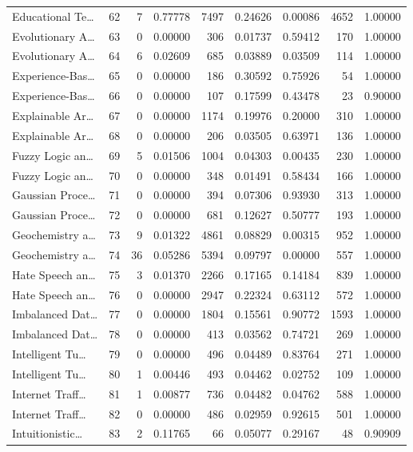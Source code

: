 \begin{table}
\begin{tabular}{lrrrrrrrr}
Educational Te… & 62 & 7 & 0.77778 & 7497 & 0.24626 & 0.00086 & 4652 & 1.00000 \\
Evolutionary A… & 63 & 0 & 0.00000 & 306 & 0.01737 & 0.59412 & 170 & 1.00000 \\
Evolutionary A… & 64 & 6 & 0.02609 & 685 & 0.03889 & 0.03509 & 114 & 1.00000 \\
Experience-Bas… & 65 & 0 & 0.00000 & 186 & 0.30592 & 0.75926 & 54 & 1.00000 \\
Experience-Bas… & 66 & 0 & 0.00000 & 107 & 0.17599 & 0.43478 & 23 & 0.90000 \\
Explainable Ar… & 67 & 0 & 0.00000 & 1174 & 0.19976 & 0.20000 & 310 & 1.00000 \\
Explainable Ar… & 68 & 0 & 0.00000 & 206 & 0.03505 & 0.63971 & 136 & 1.00000 \\
Fuzzy Logic an… & 69 & 5 & 0.01506 & 1004 & 0.04303 & 0.00435 & 230 & 1.00000 \\
Fuzzy Logic an… & 70 & 0 & 0.00000 & 348 & 0.01491 & 0.58434 & 166 & 1.00000 \\
Gaussian Proce… & 71 & 0 & 0.00000 & 394 & 0.07306 & 0.93930 & 313 & 1.00000 \\
Gaussian Proce… & 72 & 0 & 0.00000 & 681 & 0.12627 & 0.50777 & 193 & 1.00000 \\
Geochemistry a… & 73 & 9 & 0.01322 & 4861 & 0.08829 & 0.00315 & 952 & 1.00000 \\
Geochemistry a… & 74 & 36 & 0.05286 & 5394 & 0.09797 & 0.00000 & 557 & 1.00000 \\
Hate Speech an… & 75 & 3 & 0.01370 & 2266 & 0.17165 & 0.14184 & 839 & 1.00000 \\
Hate Speech an… & 76 & 0 & 0.00000 & 2947 & 0.22324 & 0.63112 & 572 & 1.00000 \\
Imbalanced Dat… & 77 & 0 & 0.00000 & 1804 & 0.15561 & 0.90772 & 1593 & 1.00000 \\
Imbalanced Dat… & 78 & 0 & 0.00000 & 413 & 0.03562 & 0.74721 & 269 & 1.00000 \\
Intelligent Tu… & 79 & 0 & 0.00000 & 496 & 0.04489 & 0.83764 & 271 & 1.00000 \\
Intelligent Tu… & 80 & 1 & 0.00446 & 493 & 0.04462 & 0.02752 & 109 & 1.00000 \\
Internet Traff… & 81 & 1 & 0.00877 & 736 & 0.04482 & 0.04762 & 588 & 1.00000 \\
Internet Traff… & 82 & 0 & 0.00000 & 486 & 0.02959 & 0.92615 & 501 & 1.00000 \\
Intuitionistic… & 83 & 2 & 0.11765 & 66 & 0.05077 & 0.29167 & 48 & 0.90909 \\

\end{tabular}
\end{table}
